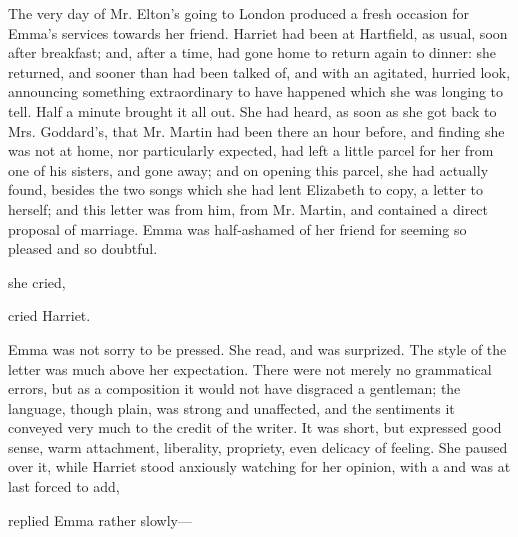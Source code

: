 The very day of Mr. Elton's going to London produced a fresh occasion for Emma's services towards her friend. Harriet had been at Hartfield, as usual, soon after breakfast; and, after a time, had gone home to return again to dinner: she returned, and sooner than had been talked of, and with an agitated, hurried look, announcing something extraordinary to have happened which she was longing to tell. Half a minute brought it all out. She had heard, as soon as she got back to Mrs. Goddard's, that Mr. Martin had been there an hour before, and finding she was not at home, nor particularly expected, had left a little parcel for her from one of his sisters, and gone away; and on opening this parcel, she had actually found, besides the two songs which she had lent Elizabeth to copy, a letter to herself; and this letter was from him, from Mr. Martin, and contained a direct proposal of marriage.  Emma was half-ashamed of her friend for seeming so pleased and so doubtful.

 she cried, 

 cried Harriet. 

Emma was not sorry to be pressed. She read, and was surprized. The style of the letter was much above her expectation. There were not merely no grammatical errors, but as a composition it would not have disgraced a gentleman; the language, though plain, was strong and unaffected, and the sentiments it conveyed very much to the credit of the writer. It was short, but expressed good sense, warm attachment, liberality, propriety, even delicacy of feeling. She paused over it, while Harriet stood anxiously watching for her opinion, with a  and was at last forced to add, 

 replied Emma rather slowly---

